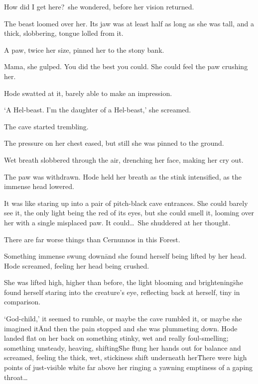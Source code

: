 How did I get here?~she wondered, before her vision returned.

The beast loomed over her. Its jaw was at least half as long as she was tall, and a thick, slobbering, 
tongue lolled from it.

A paw, twice her size, pinned her to the stony bank.

Mama, she gulped. You did the best you could. She could feel the paw crushing her.

Hode swatted at it, barely able to make an impression.

`A Hel-beast. I'm the daughter of a Hel-beast,' she screamed.

The cave started trembling.

The pressure on her chest eased, but still she was pinned to the ground.

Wet breath slobbered through the air, drenching her face, making her cry out.

The paw was withdrawn. Hode held her breath as the stink intensified, as the immense head lowered.

It was like staring up into a pair of pitch-black cave entrances. She could barely see it, the only 
light being the red of its eyes, but she could smell it, looming over her with a single misplaced paw. It 
could\ldots\ She shuddered at her thought.

There are far worse things than Cernunnos in this Forest.

Something immense swung down\=and she found herself being lifted by her head. Hode screamed, feeling 
her head being crushed.

She was lifted high, higher than before, the light blooming and brightening\=she found herself staring 
into the creature's eye, reflecting back at herself, tiny in comparison.

`God-child,' it seemed to rumble, or maybe the cave rumbled it, or maybe she imagined it\=

And then the pain stopped and she was plummeting down. Hode landed flat on her back on something stinky, wet 
and really foul-smelling; something unsteady, heaving, shifting\=

She flung her hands out for balance and screamed, feeling the thick, wet, stickiness shift underneath 
her\=

There were high points of just-visible white far above her ringing a yawning emptiness of a gaping throat\ldots

